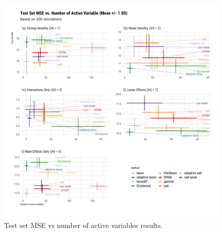\documentclass[12pt,letter]{article}\usepackage[]{graphicx}\usepackage[]{color}
\newenvironment{knitrout}{}{} %
\begin{document}
\begin{knitrout}\scriptsize
{}\color{fgcolor}\begin{figure}[H]

{\centering \includegraphics[width=1\linewidth]{figure/plot-mse-nactive-sim-1} 

}

\caption[Test set MSE vs number of active variables results]{Test set MSE vs number of active variables results.}\label{fig:plot-mse-nactive-sim}
\end{figure}


\end{knitrout}
\end{document}
